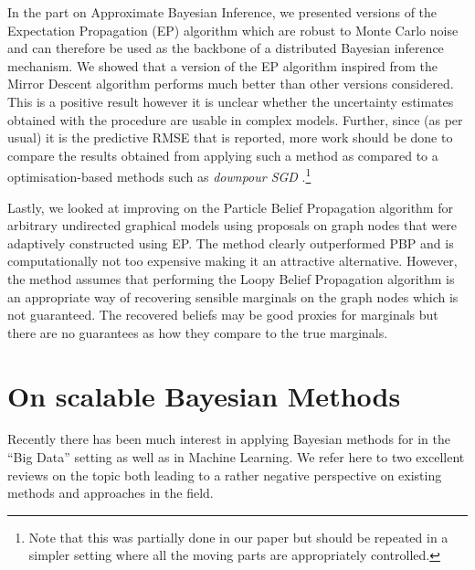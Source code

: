 In the part on Approximate Bayesian Inference, we presented versions of the Expectation Propagation (EP) algorithm which are robust to Monte Carlo noise and can therefore be used as the backbone of a distributed Bayesian inference mechanism. We showed that a version of the EP algorithm inspired from the Mirror Descent algorithm performs much better than other versions considered. This is a positive result however it is unclear whether the uncertainty estimates obtained with the procedure are usable in complex models. Further, since (as per usual) it is the predictive RMSE that is reported, more work should be done to compare the results obtained from applying such a method as compared to a optimisation-based methods such as \emph{downpour SGD} \citep{dean12}.\footnote{Note that this was partially done in our paper \citep{hasenclever16} but should be repeated in a simpler setting where all the moving parts are appropriately controlled.} 

Lastly, we looked at improving on the Particle Belief Propagation algorithm for arbitrary undirected graphical models using proposals on graph nodes that were adaptively constructed using EP. The method clearly outperformed PBP and is computationally not too expensive making it an attractive alternative. However, the method assumes that performing the Loopy Belief Propagation algorithm is an appropriate way of recovering sensible marginals on the graph nodes which is not guaranteed. The recovered beliefs may be good proxies for marginals but there are no guarantees as how they compare to the true marginals.

\section{On scalable Bayesian Methods}

Recently there has been much interest in applying Bayesian methods for in the ``Big Data'' setting as well as in Machine Learning. We refer here to two excellent reviews on the topic \citet{green15, bardenet17} both leading to a rather negative perspective on existing methods and approaches in the field. 

